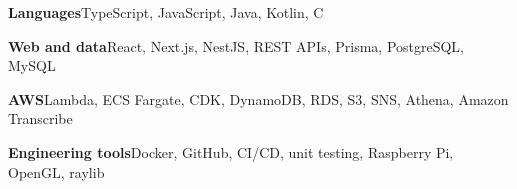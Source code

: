 \textbf{Languages}\enspace TypeScript, JavaScript, Java, Kotlin, C\par
\textbf{Web and data}\enspace React, Next.js, NestJS, REST APIs, Prisma, PostgreSQL, MySQL\par
\textbf{AWS}\enspace Lambda, ECS Fargate, CDK, DynamoDB, RDS, S3, SNS, Athena, Amazon Transcribe\par
\textbf{Engineering tools}\enspace Docker, GitHub, CI/CD, unit testing, Raspberry Pi, OpenGL, raylib\par
